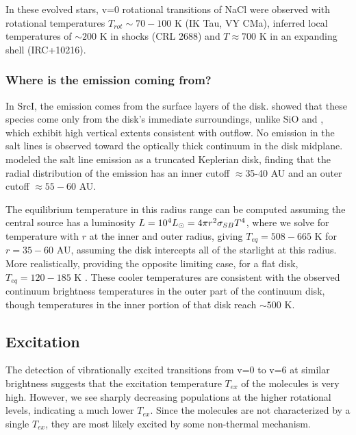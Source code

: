 \documentclass[twocolumn]{aastex62}
\newcommand{\sourcei}{SrcI\xspace}
\begin{document}
In these evolved stars, v=0 rotational transitions of NaCl were observed
with rotational temperatures ${T_{rot}\sim70-100}$ K (IK Tau, VY CMa), inferred
local temperatures of $\sim200$ K in shocks (CRL 2688) and $T\approx700$ K  in
an expanding shell (IRC+10216).

\subsubsection{Where is the emission coming from?}
In \sourcei, the emission comes from the surface layers of the disk.
\citet{Ginsburg2018b} showed that these species come only from the disk's
immediate surroundings, unlike SiO and \water, which exhibit high vertical
extents consistent with outflow.  No emission in the salt lines is observed
toward the optically thick continuum in the disk midplane.
\citet{Ginsburg2018b} modeled the salt line emission as a truncated Keplerian
disk, finding that the radial distribution of the emission has an inner cutoff
$\approx$35-40 AU and an outer cutoff $\approx55-60$ AU.

The equilibrium temperature in this radius range can be computed assuming the central
source has a luminosity $L=10^4 L_{\odot} = 4 \pi r^2 \sigma_{SB} T^4 $, where we
solve for temperature with $r$ at the inner and outer radius, giving $T_{eq} =
508-665$ K for $r=35-60$ AU, assuming the disk intercepts all of the starlight 
at this radius.  More realistically, providing the opposite limiting case,
for a flat disk, $T_{eq}=120-185$ K \citep{Chiang1997a}.  These cooler temperatures
are consistent with the observed continuum brightness temperatures in the outer
part of the continuum disk, though temperatures in the inner portion of that
disk reach $\sim500$ K.


\subsection{Excitation}
The detection of vibrationally excited transitions from v=0 to v=6 at similar brightness
suggests that the excitation temperature $T_{ex}$ of the molecules is very high.  However,
we see sharply decreasing populations at the higher rotational levels, indicating a much
lower $T_{ex}$.  Since the molecules are not characterized by a single $T_{ex}$, they
are most likely excited by some non-thermal mechanism.
\end{document}
